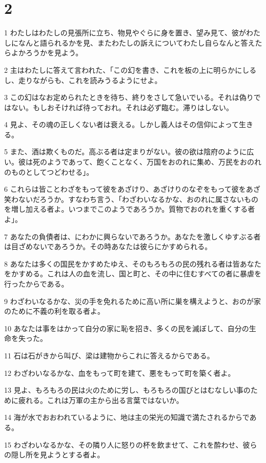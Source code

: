 \chapter{2}

\par 1 わたしはわたしの見張所に立ち、物見やぐらに身を置き、望み見て、彼がわたしになんと語られるかを見、またわたしの訴えについてわたし自らなんと答えたらよかろうかを見よう。
\par 2 主はわたしに答えて言われた、「この幻を書き、これを板の上に明らかにしるし、走りながらも、これを読みうるようにせよ。
\par 3 この幻はなお定められたときを待ち、終りをさして急いでいる。それは偽りではない。もしおそければ待っておれ。それは必ず臨む。滞りはしない。
\par 4 見よ、その魂の正しくない者は衰える。しかし義人はその信仰によって生きる。
\par 5 また、酒は欺くものだ。高ぶる者は定まりがない。彼の欲は陰府のように広い。彼は死のようであって、飽くことなく、万国をおのれに集め、万民をおのれのものとしてつどわせる」。
\par 6 これらは皆ことわざをもって彼をあざけり、あざけりのなぞをもって彼をあざ笑わないだろうか。すなわち言う、「わざわいなるかな、おのれに属さないものを増し加える者よ。いつまでこのようであろうか。質物でおのれを重くする者よ」。
\par 7 あなたの負債者は、にわかに興らないであろうか。あなたを激しくゆすぶる者は目ざめないであろうか。その時あなたは彼らにかすめられる。
\par 8 あなたは多くの国民をかすめたゆえ、そのもろもろの民の残れる者は皆あなたをかすめる。これは人の血を流し、国と町と、その中に住むすべての者に暴虐を行ったからである。
\par 9 わざわいなるかな、災の手を免れるために高い所に巣を構えようと、おのが家のために不義の利を取る者よ。
\par 10 あなたは事をはかって自分の家に恥を招き、多くの民を滅ぼして、自分の生命を失った。
\par 11 石は石がきから叫び、梁は建物からこれに答えるからである。
\par 12 わざわいなるかな、血をもって町を建て、悪をもって町を築く者よ。
\par 13 見よ、もろもろの民は火のために労し、もろもろの国びとはむなしい事のために疲れる。これは万軍の主から出る言葉ではないか。
\par 14 海が水でおおわれているように、地は主の栄光の知識で満たされるからである。
\par 15 わざわいなるかな、その隣り人に怒りの杯を飲ませて、これを酔わせ、彼らの隠し所を見ようとする者よ。
